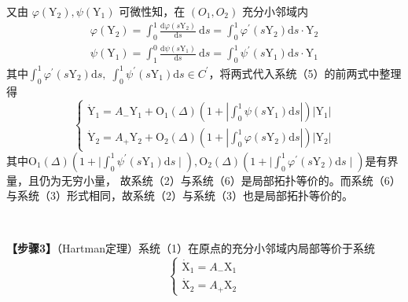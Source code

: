 \documentclass[12pt,a4paper,UTF8]{ctexart}
\begin{document}
又由 $\varphi\left(\mathrm{Y}_2\right), \psi\left(\mathrm{Y}_1\right)$ 可微性知，在 $\left(O_1, O_2\right)$ 充分小邻域内
\begin{equation*}
	\begin{aligned}
		\varphi\left(\mathrm{Y}_2\right)=\int_0^1 \frac{\mathrm{d} \varphi\left(s \mathrm{Y}_2\right)}{\mathrm{d} s} \mathrm{~d} s=\int_0^1 \varphi^{\prime}\left(s \mathrm{Y}_2\right) \mathrm{d} s \cdot \mathrm{Y}_2\\
        \psi\left(\mathrm{Y}_1\right)=\int_1^0 \frac{\mathrm{d} \psi\left(s \mathrm{Y}_1\right)}{\mathrm{d} s} \mathrm{~d} s=\int_0^1 \psi^{\prime}\left(s \mathrm{Y}_1\right) \mathrm{d} s \cdot \mathrm{Y}_1
	\end{aligned}
\end{equation*}
其中$\int_0^1{\varphi}^{\prime}\left(s \mathrm{Y}_2\right) \mathrm{d} s, \; \int_0^1 \psi^{\prime}\left(s \mathrm{Y}_1\right) \mathrm{d} s \in C^{\prime}$，将两式代入系统（5）的前两式中整理得
\begin{equation}
	\left\{\begin{array}{l}
		\dot{\mathrm{Y}}_1=A_{-} \mathrm{Y}_1+\mathrm{O}_1(\Delta)\left(1+\left|\int_0^1 {\psi}\left(s \mathrm{Y}_1\right) \mathrm{d} s\right|\right)\left|\mathrm{Y}_1\right|\\
        \dot{\mathrm{Y}}_2=A_{+} \mathrm{Y}_2+\mathrm{O}_2(\Delta)\left(1+\left|\int_0^1 {\varphi}\left(s \mathrm{Y}_2\right) \mathrm{d} s\right|\right)\left|\mathrm{Y}_2\right|
	\end{array}\right.
\end{equation}
其中$\mathrm{O}_1(\Delta)\left(1+\mid \int_0^1 \psi^{\prime}\left(s \mathrm{Y}_1\right) \mathrm{d} s\mid\right), \mathrm{O}_2(\Delta)\left(1+\mid \int_0^1 {\varphi}^{\prime}\left(s \mathrm{Y}_2\right) \mathrm{d} s\mid\right)$是有界量，且仍为无穷小量，
故系统（2）与系统（6）是局部拓扑等价的。而系统（6）与系统（3）形式相同，故系统（2）与系统（3）也是局部拓扑等价的。


\begin{spacing}{1.3}
	~
\end{spacing}
\textbf{【步骤3】}（Hartman定理）系统（1）在原点的充分小邻域内局部等价于系统
\begin{equation}
	\left\{\begin{array}{l}\dot{\mathrm{X}}_1=A_{-} \mathrm{X}_1 \\ \dot{\mathrm{X}}_2=A_{+} \mathrm{X}_2\end{array}\right.
\end{equation}
\end{document}
